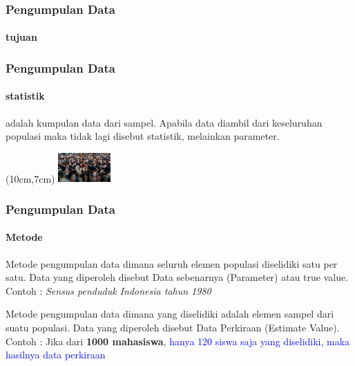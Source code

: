\documentclass[main.tex]{subfiles}
\begin{document}
\begin{frame}[c]
	\frametitle{Pengumpulan Data}
	\framesubtitle{tujuan}

\end{frame}
\begin{frame}[c]
	\frametitle{Pengumpulan Data}
	\framesubtitle{statistik}
	adalah kumpulan data dari sampel. Apabila data diambil dari keseluruhan populasi maka tidak lagi disebut statistik, melainkan parameter.

	\begin{textblock*}{2cm}(10cm,7cm) %
		\includegraphics[width=2cm]{figures/popu}
	\end{textblock*}

\end{frame}

\begin{frame}[c]
	\frametitle{Pengumpulan Data}
	\framesubtitle{Metode}
	\begin{description}[style=nextline]
		\item[Metode Sensun]
			Metode pengumpulan data dimana seluruh elemen populasi diselidiki satu per satu.  Data yang diperoleh disebut Data sebenarnya (Parameter) atau true value. \hfill \\
			Contoh :  \textit{Sensus penduduk Indonesia tahun 1980}
		\item[Metode Sampling] Metode pengumpulan data dimana yang diselidiki adalah elemen  sampel dari suatu populasi.   Data yang diperoleh disebut  Data Perkiraan (Estimate Value).                                                        \hfill \\ Contoh :  Jika dari \textbf{1000 mahasiswa}, \textcolor{blue}{hanya 120 siswa saja yang diselidiki, maka hasilnya data perkiraan}
	\end{description}
\end{frame}
\end{document}
